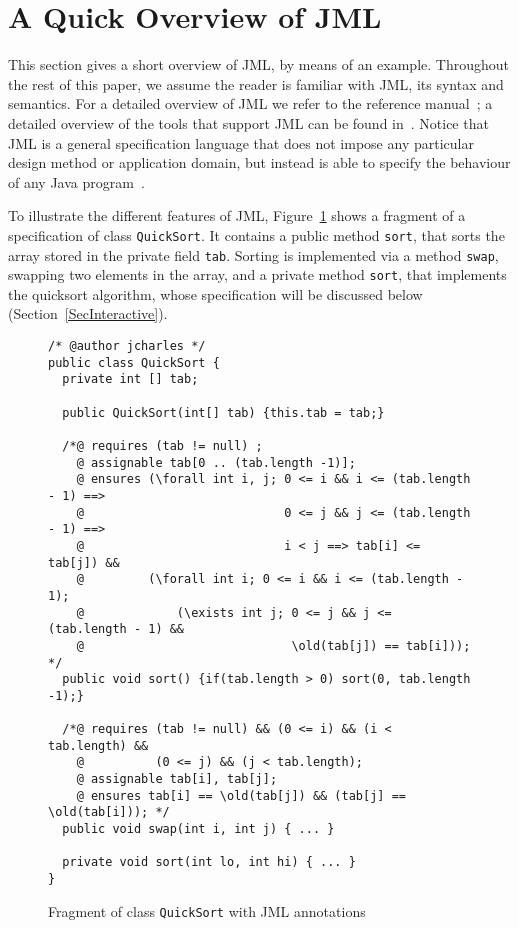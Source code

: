 \section{A Quick Overview of JML}\label{SecJML}



This section gives a short overview of JML, by means of an
example. Throughout the rest of this paper, we assume the reader is
familiar with JML, its syntax and semantics. For a detailed overview
of JML we refer to the reference manual~\cite{JMLReferenceManual05}; a
detailed overview of the tools that support JML can be found
in~\cite{BurdyCCEKLLP05}.  Notice that JML is a general specification
language that does not impose any particular design method or
application domain, but instead is able to specify the behaviour of
any Java program~\cite{LeavensBR06}.



To illustrate the different features of JML, Figure~\ref{FigJMLSpec}
shows a fragment of a specification of class
\texttt{QuickSort}. It contains a public method
\texttt{sort}, that sorts the array stored in the private field
\texttt{tab}. Sorting is implemented via  a method \texttt{swap},
swapping two elements in the array, and a private method
\texttt{sort}, that implements the quicksort algorithm, whose
specification will be discussed below (Section~\ref{SecInteractive}).

\begin{figure}[t!]
{\small
\begin{verbatim}
/* @author jcharles */
public class QuickSort {
  private int [] tab;

  public QuickSort(int[] tab) {this.tab = tab;}

  /*@ requires (tab != null) ;
    @ assignable tab[0 .. (tab.length -1)];
    @ ensures (\forall int i, j; 0 <= i && i <= (tab.length - 1) ==> 
    @                            0 <= j && j <= (tab.length - 1) ==>
    @                            i < j ==> tab[i] <= tab[j]) &&
    @         (\forall int i; 0 <= i && i <= (tab.length - 1); 
    @             (\exists int j; 0 <= j && j <= (tab.length - 1) && 
    @                             \old(tab[j]) == tab[i])); */
  public void sort() {if(tab.length > 0) sort(0, tab.length -1);}

  /*@ requires (tab != null) && (0 <= i) && (i < tab.length) && 
    @          (0 <= j) && (j < tab.length);
    @ assignable tab[i], tab[j];
    @ ensures tab[i] == \old(tab[j]) && (tab[j] == \old(tab[i])); */
  public void swap(int i, int j) { ... }

  private void sort(int lo, int hi) { ... }
}
\end{verbatim}
}
\vspace*{-1em}\caption{Fragment of class \texttt{QuickSort} with JML annotations} 
\label{FigJMLSpec}
\end{figure}



